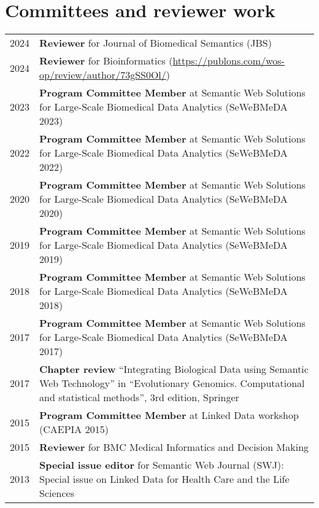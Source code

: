 \documentclass[11pt,fullpage]{article}
\begin{document}
\section*{Committees and reviewer work}


\begin{longtable}{p{0.5in}|p{5.5in}}
2024 & \textbf{Reviewer} for Journal of Biomedical Semantics (JBS) \\
2024 & \textbf{Reviewer} for Bioinformatics (\href{https://publons.com/wos-op/review/author/73gSS0Ol/}{https://publons.com/wos-op/review/author/73gSS0Ol/}) \\
2023 & \textbf{Program Committee Member} at Semantic Web Solutions for Large-Scale Biomedical Data Analytics (SeWeBMeDA 2023) \\
2022 & \textbf{Program Committee Member} at Semantic Web Solutions for Large-Scale Biomedical Data Analytics (SeWeBMeDA 2022) \\
2020 & \textbf{Program Committee Member} at Semantic Web Solutions for Large-Scale Biomedical Data Analytics (SeWeBMeDA 2020) \\
2019 & \textbf{Program Committee Member} at Semantic Web Solutions for Large-Scale Biomedical Data Analytics (SeWeBMeDA 2019) \\  
2018 & \textbf{Program Committee Member} at Semantic Web Solutions for Large-Scale Biomedical Data Analytics (SeWeBMeDA 2018) \\
2017 & \textbf{Program Committee Member} at Semantic Web Solutions for Large-Scale Biomedical Data Analytics (SeWeBMeDA 2017) \\
2017 & \textbf{Chapter review} ``Integrating Biological Data using Semantic Web Technology'' in ``Evolutionary Genomics. Computational and statistical methods'', 3rd edition, Springer \\
2015 & \textbf{Program Committee Member} at Linked Data workshop (CAEPIA 2015) \\
2015 & \textbf{Reviewer} for BMC Medical Informatics and Decision Making \\
2013 & {\bf Special issue editor} for Semantic Web Journal (SWJ): Special issue on Linked Data for Health Care and the Life Sciences \\

\end{longtable}
\end{document}
